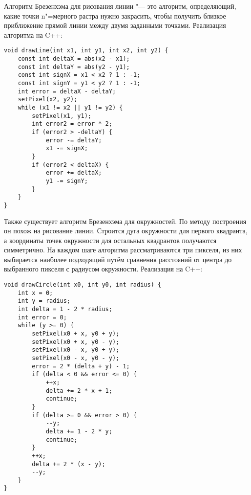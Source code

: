 Алгоритм Брезенхэма для рисования линии "--- это алгоритм, определяющий, какие точки n"=мерного растра нужно закрасить, чтобы получить близкое приближение прямой линии между двумя заданными точками. Реализация алгоритма на C++\cite{bresenham}:
\begin{lstlisting}[style=myStyle]
void drawLine(int x1, int y1, int x2, int y2) {
    const int deltaX = abs(x2 - x1);
    const int deltaY = abs(y2 - y1);
    const int signX = x1 < x2 ? 1 : -1;
    const int signY = y1 < y2 ? 1 : -1;
    int error = deltaX - deltaY;
    setPixel(x2, y2);
    while (x1 != x2 || y1 != y2) {
        setPixel(x1, y1);
        int error2 = error * 2;
        if (error2 > -deltaY) {
            error -= deltaY;
            x1 -= signX;
        }
        if (error2 < deltaX) {
            error += deltaX;
            y1 -= signY;
        }
    }
}
\end{lstlisting}

Также существует алгоритм Брезенхэма для окружностей. По методу построения он похож на рисование линии. Строится дуга окружности для первого квадранта, а координаты точек окружности для остальных квадрантов получаются симметрично. На каждом шаге алгоритма рассматриваются три пикселя, из них выбирается наиболее подходящий путём сравнения расстояний от центра до выбранного пикселя с радиусом окружности. Реализация на C++\cite{bresenham}:
\begin{lstlisting}[style=myStyle]
void drawCircle(int x0, int y0, int radius) {
    int x = 0;
    int y = radius;
    int delta = 1 - 2 * radius;
    int error = 0;
    while (y >= 0) {
        setPixel(x0 + x, y0 + y);
        setPixel(x0 + x, y0 - y);
        setPixel(x0 - x, y0 + y);
        setPixel(x0 - x, y0 - y);
        error = 2 * (delta + y) - 1;
        if (delta < 0 && error <= 0) {
            ++x;
            delta += 2 * x + 1;
            continue;
        }
        if (delta >= 0 && error > 0) {
            --y;
            delta += 1 - 2 * y;
            continue;
        }
        ++x;
        delta += 2 * (x - y);
        --y;
    }
}
\end{lstlisting}